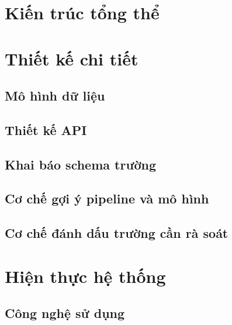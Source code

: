 ﻿\documentclass[12pt]{report}
\begin{document}
\section{Kiến trúc tổng thể}\label{sec:sys_architecture}


\section{Thiết kế chi tiết}\label{sec:sys_detail}

\subsection{Mô hình dữ liệu}

\subsection{Thiết kế API}

\subsection{Khai báo schema trường}

\subsection{Cơ chế gợi ý pipeline và mô hình}

\subsection{Cơ chế đánh dấu trường cần rà soát}

\section{Hiện thực hệ thống}\label{sec:sys_implementation}

\subsection{Công nghệ sử dụng}
\end{document}
